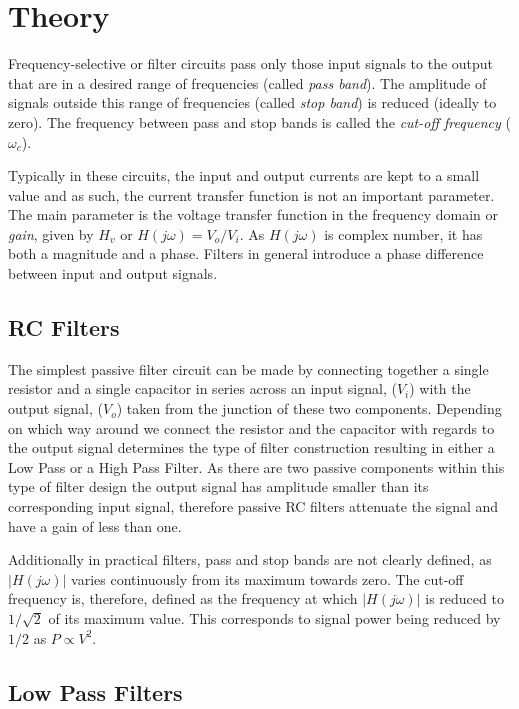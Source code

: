 \section{Theory}

Frequency-selective or filter circuits pass only those input signals to the output that are in a desired range of frequencies (called \textit{pass band}). The amplitude of signals outside this range of frequencies (called \textit{stop band}) is reduced (ideally to zero). The frequency between pass and stop bands is called the \textit{cut-off frequency} ($\omega_c$). 

Typically in these circuits, the input and output currents are kept to a small value and as such, the current transfer function is not an important parameter. The main parameter is the voltage transfer function in the frequency domain or \textit{gain}, given by $H_v$ or $H(j\omega) = V_o/V_i$. As $H(j\omega)$ is complex number, it has both a magnitude and a phase. Filters in general introduce a phase difference between input and output signals.

\subsection*{RC Filters}

The simplest passive filter circuit can be made by connecting together a single resistor and a single capacitor in series across an input signal, ($V_i$) with the output signal, ($V_o$) taken from the junction of these two components. Depending on which way around we connect the resistor and the capacitor with regards to the output signal determines the type of filter construction resulting in either a Low Pass or a High Pass Filter. As there are two passive components within this type of filter design the output signal has amplitude smaller than its corresponding input signal, therefore passive RC filters attenuate the signal and have a gain of less than one.

Additionally in practical filters, pass and stop bands are not clearly defined, as $|H(j\omega)|$ varies continuously from its maximum towards zero. The cut-off frequency is, therefore, defined as the frequency at which $|H(j\omega)|$ is reduced to $1/\sqrt{2}$ of its maximum value. This corresponds to signal power being reduced by $1/2$ as $P \propto V^2$.

\subsection{Low Pass Filters}

